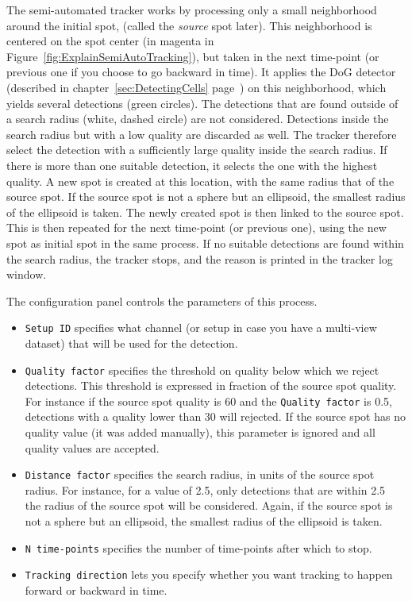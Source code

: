 The semi-automated tracker works by processing only a small neighborhood around the initial spot, (called the \textit{source} spot later).
This neighborhood is centered on the spot center (in magenta in Figure~\ref{fig:ExplainSemiAutoTracking}), but taken in the next time-point (or previous one if you choose to go backward in time).
It applies the DoG detector (described in chapter~\ref{sec:DetectingCells} page~\pageref{sec:DetectingCells}) on this neighborhood, which yields several detections (green circles).
The detections that are found outside of a search radius (white, dashed circle) are not considered.
Detections inside the search radius but with a low quality are discarded as well.
The tracker therefore select the detection with a sufficiently large quality inside the search radius. 
If there is more than one suitable detection, it selects the one with the highest quality.
A new spot is created at this location, with the same radius that of the source spot. 
If the source spot is not a sphere but an ellipsoid, the smallest radius of the ellipsoid is taken. 
The newly created spot is then linked to the source spot. 
This is then repeated for the next time-point (or previous one), using the new spot as initial spot in the same process.
If no suitable detections are found within the search radius, the tracker stops, and the reason is printed in the tracker log window.

The configuration panel controls the parameters of this process.
\begin{itemize}
    
    \item \texttt{Setup ID} specifies what channel (or setup in case you have a multi-view dataset) that will be used for the detection.
    
    \item \texttt{Quality factor} specifies the threshold on quality below which we reject detections. This threshold is expressed in fraction of the source spot quality. For instance if the source spot quality is 60 and the \texttt{Quality factor} is 0.5, detections with a quality lower than 30 will rejected. If the source spot has no quality value (it was added manually), this parameter is ignored and all quality values are accepted.
    
    \item \texttt{Distance factor} specifies the search radius, in units of the source spot radius. For instance, for a value of 2.5, only detections that are within 2.5 \texttimes\, the radius of the source spot will be considered. Again, if the source spot is not a sphere but an ellipsoid, the smallest radius of the ellipsoid is taken. 
    
    \item \texttt{N time-points} specifies the number of time-points after which to stop.
    
    \item \texttt{Tracking direction} lets you specify whether you want tracking to happen forward or backward in time.
    
\end{itemize}

